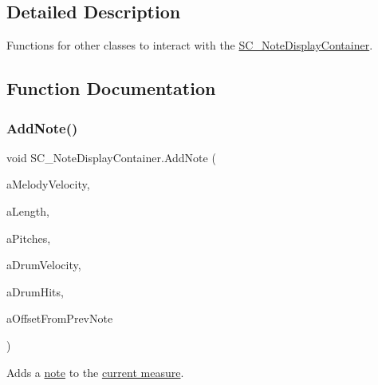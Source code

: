 \subsection{Detailed Description}
Functions for other classes to interact with the \hyperlink{class_s_c___note_display_container}{S\+C\+\_\+\+Note\+Display\+Container}. 

\subsection{Function Documentation}
\mbox{\label{group___s_c___n_d_c_pub_func_ga43e58800daae0e46bbe1b86d78c2f677}} 
\subsubsection{\texorpdfstring{Add\+Note()}{AddNote()}}
{\footnotesize\ttfamily void S\+C\+\_\+\+Note\+Display\+Container.\+Add\+Note (\begin{DoxyParamCaption}\item[{int}]{a\+Melody\+Velocity,  }\item[{\hyperlink{group___music_enums_gaf11b5f079adbb21c800b9eca1c5c3cbd}{Music.\+N\+O\+T\+E\+\_\+\+L\+E\+N\+G\+TH}}]{a\+Length,  }\item[{\hyperlink{group___music_enums_ga508f69b199ea518f935486c990edac1d}{Music.\+P\+I\+T\+CH} \mbox{[}$\,$\mbox{]}}]{a\+Pitches,  }\item[{int}]{a\+Drum\+Velocity,  }\item[{\hyperlink{group___music_enums_gade475b4382c7066d1af13e7c13c029b6}{Music.\+D\+R\+UM} \mbox{[}$\,$\mbox{]}}]{a\+Drum\+Hits,  }\item[{\hyperlink{group___music_enums_gaf11b5f079adbb21c800b9eca1c5c3cbd}{Music.\+N\+O\+T\+E\+\_\+\+L\+E\+N\+G\+TH}}]{a\+Offset\+From\+Prev\+Note }\end{DoxyParamCaption})}



Adds a \hyperlink{group___music_structs_struct_music_1_1_combined_note}{note} to the \hyperlink{group___doc_s_c___m_d_p}{current measure}. 


